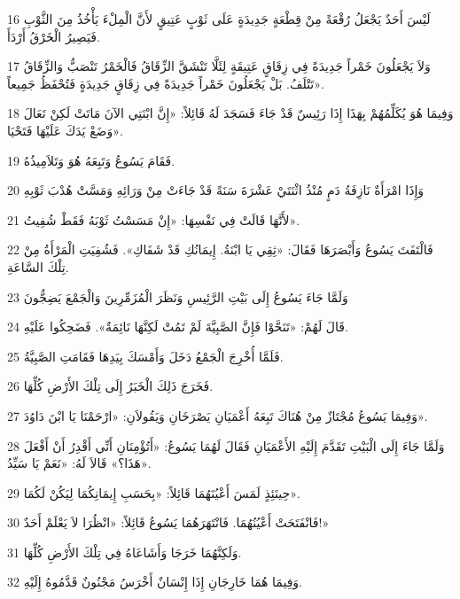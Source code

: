 \par 16 لَيْسَ أَحَدٌ يَجْعَلُ رُقْعَةً مِنْ قِطْعَةٍ جَدِيدَةٍ عَلَى ثَوْبٍ عَتِيقٍ لأَنَّ الْمِلْءَ يَأْخُذُ مِنَ الثَّوْبِ فَيَصِيرُ الْخَرْقُ أَرْدَأَ.
\par 17 وَلاَ يَجْعَلُونَ خَمْراً جَدِيدَةً فِي زِقَاقٍ عَتِيقَةٍ لِئَلَّا تَنْشَقَّ الزِّقَاقُ فَالْخَمْرُ تَنْصَبُّ وَالزِّقَاقُ تَتْلَفُ. بَلْ يَجْعَلُونَ خَمْراً جَدِيدَةً فِي زِقَاقٍ جَدِيدَةٍ فَتُحْفَظُ جَمِيعاً».
\par 18 وَفِيمَا هُوَ يُكَلِّمُهُمْ بِهَذَا إِذَا رَئِيسٌ قَدْ جَاءَ فَسَجَدَ لَهُ قَائِلاً: «إِنَّ ابْنَتِي الآنَ مَاتَتْ لَكِنْ تَعَالَ وَضَعْ يَدَكَ عَلَيْهَا فَتَحْيَا».
\par 19 فَقَامَ يَسُوعُ وَتَبِعَهُ هُوَ وَتَلاَمِيذُهُ.
\par 20 وَإِذَا امْرَأَةٌ نَازِفَةُ دَمٍ مُنْذُ اثْنَتَيْ عَشْرَةَ سَنَةً قَدْ جَاءَتْ مِنْ وَرَائِهِ وَمَسَّتْ هُدْبَ ثَوْبِهِ
\par 21 لأَنَّهَا قَالَتْ فِي نَفْسِهَا: «إِنْ مَسَسْتُ ثَوْبَهُ فَقَطْ شُفِيتُ».
\par 22 فَالْتَفَتَ يَسُوعُ وَأَبْصَرَهَا فَقَالَ: «ثِقِي يَا ابْنَةُ. إِيمَانُكِ قَدْ شَفَاكِ». فَشُفِيَتِ الْمَرْأَةُ مِنْ تِلْكَ السَّاعَةِ.
\par 23 وَلَمَّا جَاءَ يَسُوعُ إِلَى بَيْتِ الرَّئِيسِ وَنَظَرَ الْمُزَمِّرِينَ وَالْجَمْعَ يَضِجُّونَ
\par 24 قَالَ لَهُمْ: «تَنَحَّوْا فَإِنَّ الصَّبِيَّةَ لَمْ تَمُتْ لَكِنَّهَا نَائِمَةٌ». فَضَحِكُوا عَلَيْهِ.
\par 25 فَلَمَّا أُخْرِجَ الْجَمْعُ دَخَلَ وَأَمْسَكَ بِيَدِهَا فَقَامَتِ الصَّبِيَّةُ.
\par 26 فَخَرَجَ ذَلِكَ الْخَبَرُ إِلَى تِلْكَ الأَرْضِ كُلِّهَا.
\par 27 وَفِيمَا يَسُوعُ مُجْتَازٌ مِنْ هُنَاكَ تَبِعَهُ أَعْمَيَانِ يَصْرَخَانِ وَيَقُولاَنِ: «ارْحَمْنَا يَا ابْنَ دَاوُدَ».
\par 28 وَلَمَّا جَاءَ إِلَى الْبَيْتِ تَقَدَّمَ إِلَيْهِ الأَعْمَيَانِ فَقَالَ لَهُمَا يَسُوعُ: «أَتُؤْمِنَانِ أَنِّي أَقْدِرُ أَنْ أَفْعَلَ هَذَا؟» قَالاَ لَهُ: «نَعَمْ يَا سَيِّدُ».
\par 29 حِينَئِذٍ لَمَسَ أَعْيُنَهُمَا قَائِلاً: «بِحَسَبِ إِيمَانِكُمَا لِيَكُنْ لَكُمَا».
\par 30 فَانْفَتَحَتْ أَعْيُنُهُمَا. فَانْتَهَرَهُمَا يَسُوعُ قَائِلاً: «انْظُرَا لاَ يَعْلَمْ أَحَدٌ!»
\par 31 وَلَكِنَّهُمَا خَرَجَا وَأَشَاعَاهُ فِي تِلْكَ الأَرْضِ كُلِّهَا.
\par 32 وَفِيمَا هُمَا خَارِجَانِ إِذَا إِنْسَانٌ أَخْرَسُ مَجْنُونٌ قَدَّمُوهُ إِلَيْهِ.
